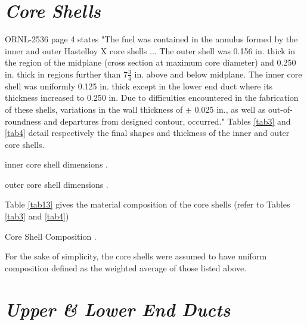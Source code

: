 \documentclass[ms,a4paper]{memoir}
\begin{document}
\section{\emph{Core Shells}}

ORNL-2536 page 4 states "The fuel was contained in the annulus formed by the inner and outer Hastelloy X core shells ... The outer shell was 0.156 in. thick in the region of the midplane (cross section at maximum core diameter) and 0.250 in. thick in regions further than 7$\frac{3}{4}$ in. above and below midplane. The inner core shell was uniformly 0.125 in. thick except in the lower end duct where its thickness increased to 0.250 in. Due to difficulties encountered in the fabrication of these shells, variations in the wall thickness of $\pm$ 0.025 in., as well as out-of-roundness and departures from designed contour, occurred." Tables \ref{tab3} and \ref{tab4} detail  respectively the final shapes and thickness of the inner and outer core shells.

\begin{table}[H]
  \centering
  \caption{inner core shell dimensions \parencite[Table 19]{ornl-2536}.}
  \label{tab3}
\end{table}

\begin{table}[H]
  \centering
  \caption{outer core shell dimensions \parencite[Table 20]{ornl-2536}.}
  \label{tab4}
\end{table}

Table \ref{tab13} gives the material composition of the core shells (refer to Tables \ref{tab3} and \ref{tab4})

\begin{table}[H]
  \centering
  \caption{Core Shell Composition \parencite[Table 25]{ornl-2536}.}
  \label{tab13}
\end{table}

For the sake of simplicity, the core shells were assumed to have uniform composition defined as the weighted average of those listed above.

\section{\emph{Upper \& Lower End Ducts}}
\end{document}
